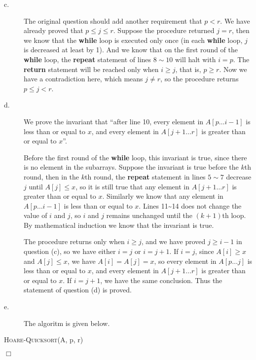 \documentclass[a4paper,10pt]{article}
\newcommand{\qed}{\hfill \ensuremath{\Box}}
\begin{document}
\begin{description}
\item[c. \hspace{9pt}] The original question should add another requirement that $p < r$. We have
already proved that $p \leq j \leq r$. Suppose the procedure returned $j = r$, then
we know that the \textbf{while} loop is executed only once (in each \textbf{while} loop, $j$ is
decreased at least by 1). And we know that on the first round of the \textbf{while}
loop, the \textbf{repeat} statement of lines $8 \sim 10$ will halt with $i = p$. The \textbf{return}
statement will be reached only when $i \geq j$, that is, $p \geq r $. Now we have
a contradiction here, which means $j \neq r$, so the procedure returns $p \leq j < r$.

\item[d. \hspace{9pt}] We prove the invariant that ``after line 10, every element in $A[p \ldots i - 1]$
is less than or equal to $x$, and every element in $A[j + 1 \ldots r]$ is greater than
or equal to $x$''.

Before the first round of the \textbf{while} loop, this invariant is true, since there is no element in the
subarrays. Suppose the invariant is true before the $k$th round, then in the $k$th
round, the \textbf{repeat} statement in lines $5 \sim 7$ decrease $j$ until $A[j] \leq x$, so it is still
true that any element in $A[j + 1 \ldots r]$ is greater than or equal to $x$.
Similarly we know that any element in $A[p \ldots i - 1]$ is less than or equal to $x$. Lines 11\textasciitilde 14
 does not change the value of $i$ and $j$, so $i$ and $j$ remains unchanged until
the $(k + 1)$th loop. By mathematical induction we know that the invariant is true.

The procedure returns only when $i \geq j$, and we have proved $j \geq i - 1$ in question (c), so we
have either $i = j$ or $i = j + 1$. If $i = j$, since $A[i] \geq x$ and $A[j] \leq x$, 
we have $A[i] = A[j] = x$, so every element in $A[p \ldots j]$ is less than or equal to $x$,
and every element in $A[j + 1 \ldots r]$ is greater than or equal to $x$. If $i = j + 1$,
we have the same conclusion. Thus the statement of question (d) is proved.

\item[e. \hspace{9pt}] The algoritm is given below.

\end{description}
\begin{algorithm}[H]
\caption{\textsc{Hoare-Quicksort}(A, p, r)}
\end{algorithm}
\qed
\end{document}
